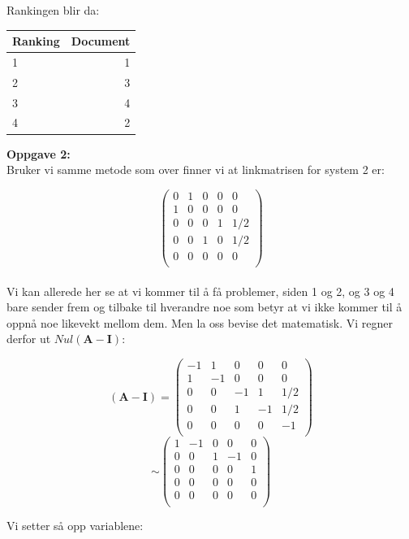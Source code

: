 \documentclass[a4paper,norsk,11pt,twoside]{article}
\begin{document}
Rankingen blir da:


\begin{center}
\begin{tabular}{l | r}
Ranking & Document \\ \hline
1 & 1\\
2 & 3\\
3 & 4\\
4 & 2
\end{tabular}
\end{center}

\newpage

\textbf{Oppgave 2:}\\

Bruker vi samme metode som over finner vi at linkmatrisen for system 2 er:

$$
\begin{pmatrix}
0 & 1 & 0 & 0 & 0\\
1 & 0 & 0 & 0 & 0\\
0 & 0 & 0 & 1 & 1/2\\
0 & 0 & 1 & 0 & 1/2\\
0 & 0 & 0 & 0 & 0\\
\end{pmatrix}
$$\\

Vi kan allerede her se at vi kommer til å få problemer, siden 1 og 2, og 3 og 4 bare sender frem og tilbake til hverandre noe som betyr at vi ikke kommer til å oppnå noe likevekt mellom dem. Men la oss bevise det matematisk. Vi regner derfor ut $Nul(\textbf{A}-\textbf{I})$:

$$
(\textbf{A}-\textbf{I}) = 
\begin{pmatrix}
-1 & 1 & 0 & 0 & 0\\
1 & -1 & 0 & 0 & 0\\
0 & 0 & -1 & 1 & 1/2\\
0 & 0 & 1 & -1 & 1/2\\
0 & 0 & 0 & 0 & -1\\
\end{pmatrix}
$$
$$
\sim
\begin{pmatrix}
1 & -1 & 0 & 0 & 0\\
0 & 0 & 1 & -1 & 0\\
0 & 0 & 0 & 0 & 1\\
0 & 0 & 0 & 0 & 0\\
0 & 0 & 0 & 0 & 0\\
\end{pmatrix}
$$

Vi setter så opp variablene:
\end{document}

